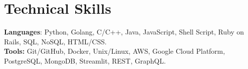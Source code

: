 
\section{Technical Skills}
    \begin{itemize}[leftmargin=0.15in, label={}]
	\small{\item{
		\textbf{Languages}{: 
                Python,
                Golang,
                C/C++,
                Java,
                JavaScript,
                Shell Script,
                Ruby on Rails,
                SQL, NoSQL,
                HTML/CSS.
            } \\
            \textbf{Tools:}{
                Git/GitHub,
                Docker,
                Unix/Linux,
                AWS,
                Google Cloud Platform,
                PostgreSQL,
                MongoDB,
                Streamlit,
                REST,
                GraphQL.
            } \\
	}}
    \end{itemize}
    \vspace{-13pt}  %

